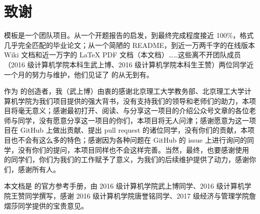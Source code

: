 \section{致谢}

{\BIThesis} 模板是一个团队项目。从一个开题报告的启发，到最终完成程度接近 100\%，格式几乎完全匹配的毕业论文；从一个简陋的 README，到近一万两千字的在线版本 Wiki 文档和近一万字的 {\LaTeX} PDF 文档（本文档）……这些离不开团队成员（2016 级计算机学院本科生武上博、2016 级计算机学院本科生王赞）两位同学近一个月的努力与维护，他们见证了 {\BIThesis} 的从无到有。

作为 {\BIThesis} 的创造者，我（武上博）由衷的感谢北京理工大学教务部、北京理工大学计算机学院为我们项目提供的强大背书，没有支持我们的领导和老师们的助力，本项目将毫无意义；感谢最初打开、阅读、与分享这一项目的介绍公众号文章的各位老师与同学，没有愿意分享这一项目的你们，本项目将无人问津；感谢愿意为这一项目在 GitHub 上做出贡献、提出 pull request 的诸位同学，没有你们的贡献，本项目也不会有这么多的特色；感谢因为各种问题在 GitHub 的 issue 上进行询问的同学，没有你们的提问，本项目同样也不会这样完善。当然，最终，也要感谢使用 {\BIThesis} 的同学们，你们为我们的工作赋予了意义，为我们的后续维护提供了动力，感谢你们，感谢所有人。

本文档是 {\BIThesis} 的官方参考手册，由 2016 级计算机学院武上博同学、2016 级计算机学院王赞同学撰写，感谢 2016 级计算机学院唐誉铭同学、2017 级经济与管理学院詹熠莎同学提供的宝贵意见。
